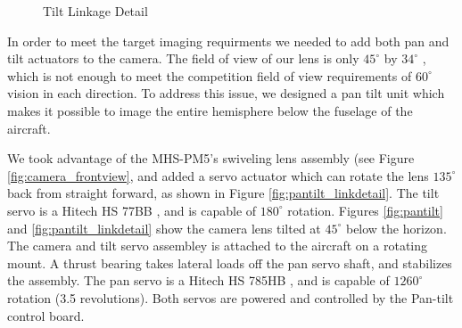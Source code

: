 \documentclass[pdftex,10pt,letter]{article}
\newcommand{\degrees}[1]
{
\begin{math}
#1^{\circ} 
\end{math}
}
\begin{document}
\begin{figure}
	\caption{Tilt Linkage Detail}
	\label{fig:pantilt_link}
\end{figure}

In order to meet the target imaging requirments we needed to add both pan and tilt actuators to the camera. The field of view of our lens is only \degrees{45} by \degrees{34}, which is not enough to meet the competition field of view requirements of \degrees{60} vision in each direction.  To address this issue, we designed a pan tilt unit which makes it possible to image the entire hemisphere below the fuselage of the aircraft.

We took advantage of the MHS-PM5's swiveling lens assembly (see Figure \ref{fig:camera_frontview}, and added a servo actuator which can rotate the lens \degrees{135} back from straight forward, as shown in Figure \ref{fig:pantilt_linkdetail}. The tilt servo is a Hitech HS 77BB \cite{hitechs77bb}, and is capable of \degrees{180} rotation. Figures \ref{fig:pantilt} and \ref{fig:pantilt_linkdetail} show the camera lens tilted at \degrees{45} below the horizon.
The camera and tilt servo assembley is attached to the aircraft on a rotating mount. A thrust bearing takes lateral loads off the pan servo shaft, and stabilizes the assembly. The pan servo is a Hitech HS 785HB \cite{hitechs785}, and is capable of \degrees{1260} rotation (3.5 revolutions). Both servos are powered and controlled by the Pan-tilt control board.
\end{document}
